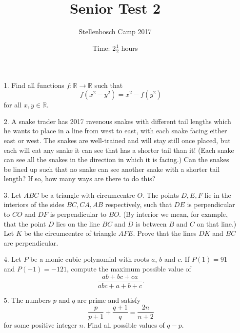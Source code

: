 \documentclass{article}
\title{Senior Test 2}
\author{Stellenbosch Camp 2017}
\date{Time: $2\frac{1}{2}$ hours}
\begin{document}
 \maketitle

\begin{enumerate}

\item[1.] %
Find all functions $f : \mathbb{R} \to \mathbb{R}$ such that
	\[f(x^2-y^2) = x^2 - f(y^2)\]
for all $x,y \in \mathbb{R}$.

\item[2.] %
A snake trader has 2017 ravenous snakes with different tail lengths which he wants to place in a line from west to east, with each snake facing either east or west. The snakes are well-trained and will stay still once placed, but each will eat any snake it can see that has a shorter tail than it! (Each snake can see all the snakes in the direction in which it is facing.) Can the snakes be lined up such that no snake can see another snake with a shorter tail length? If so, how many ways are there to do this?

\item[3.] %
Let $ABC$ be a triangle with circumcentre $O$. The points $D,E,F$ lie in the interiors of the sides $BC,CA,AB$ respectively, such that $DE$ is perpendicular to $CO$ and $DF$ is perpendicular to $BO$. (By interior we mean, for example, that the point $D$ lies on the line $BC$ and $D$ is between $B$ and $C$ on that line.) Let $K$ be the circumcentre of triangle $AFE$. Prove that the lines $DK$ and $BC$ are perpendicular.

\item[4.] %
Let $P$ be a monic cubic polynomial with roots $a$, $b$ and $c$. If $P(1) = 91$ and $P(-1) = -121$, compute the maximum possible value of
	\[\frac{ab+bc+ca}{abc+a+b+c}.\]

\item[5.] %
The numbers $p$ and $q$ are prime and satisfy
	\[\frac{p}{{p + 1}} + \frac{{q + 1}}{q} = \frac{{2n}}{{n + 2}}\]
for some positive integer $n$. Find all possible values of $q-p$.

\end{enumerate}
\end{document}
